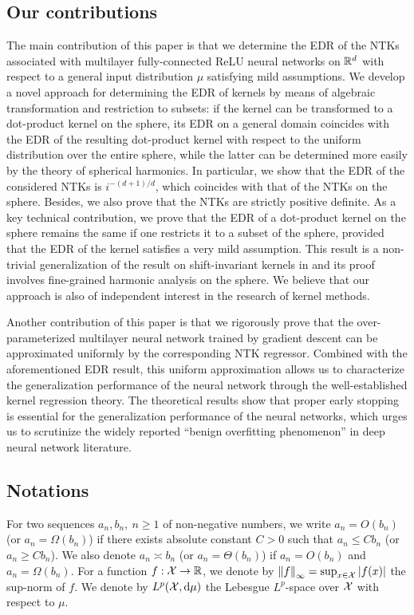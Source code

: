\subsection{Our contributions}

The main contribution of this paper is that we determine the EDR of the NTKs associated with multilayer fully-connected ReLU neural networks
on $\mathbb{R}^d$ with respect to a general input distribution $\mu$ satisfying mild assumptions.
We develop a novel approach for determining the EDR of kernels by means of algebraic transformation and restriction to subsets:
if the kernel can be transformed to a dot-product kernel on the sphere,
its EDR on a general domain coincides with the EDR of the resulting dot-product kernel with respect to the uniform distribution over the entire sphere,
while the latter can be determined more easily by the theory of spherical harmonics.
In particular, we show that the EDR of the considered NTKs is $i^{-(d+1)/d}$, which coincides with that of the NTKs on the sphere.
Besides, we also prove that the NTKs are strictly positive definite.
As a key technical contribution,
we prove that the EDR of a dot-product kernel on the sphere remains the same if one restricts it to a subset of the sphere, provided that
the EDR of the kernel satisfies a very mild assumption.
This result is a non-trivial generalization of the result on shift-invariant kernels in \citet{widom1963_AsymptoticBehavior}
and its proof involves fine-grained harmonic analysis on the sphere.
We believe that our approach is also of independent interest in the research of kernel methods.


Another contribution of this paper is that we rigorously prove that
the over-parameterized multilayer neural network trained by gradient descent can be approximated uniformly by the corresponding NTK regressor.
Combined with the aforementioned EDR result,
this uniform approximation allows us to characterize the generalization performance of the neural network through the well-established kernel regression theory.
The theoretical results show that proper early stopping is essential for the generalization performance of the neural networks,
which urges us to scrutinize the widely reported ``benign overfitting phenomenon'' in deep neural network literature.

\subsection{Notations}

For two sequences $a_n, b_n,~n\geq 1$ of non-negative numbers,
we write $a_n = O(b_n)$ (or $a_n = \Omega(b_n)$) if there exists absolute constant $C > 0$ such that
$a_n \leq C b_n$ (or $a_n \geq C b_n$).
We also denote $a_n \asymp b_n$ (or $a_n =\Theta(b_n)$) if $a_n = O(b_n)$ and $a_n = \Omega(b_n)$.
For a function $f : \mathcal{X} \to \mathbb{R}$, we denote by $\norm{f}_{\infty} = \sup_{x \in \mathcal{X}}\abs{f(x)}$ the sup-norm of $f$.
We denote by $L^p(\mathcal{X},\dd \mu)$ the Lebesgue $L^p$-space over $\mathcal{X}$ with respect to $\mu$.